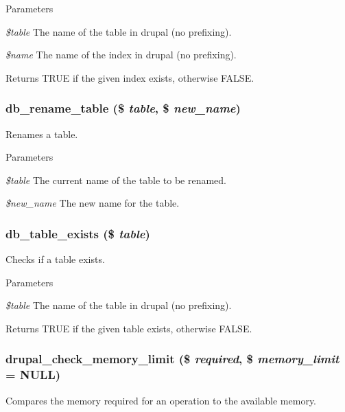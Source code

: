 \begin{DoxyParams}{Parameters}
\item[{\em \$table}]The name of the table in drupal (no prefixing). \item[{\em \$name}]The name of the index in drupal (no prefixing).\end{DoxyParams}
\begin{DoxyReturn}{Returns}
TRUE if the given index exists, otherwise FALSE. 
\end{DoxyReturn}
\hypertarget{group__schemaapi_ga629fe4d738f4caeb9d8c8acc2cc4d05b}{
\subsubsection[{db\_\-rename\_\-table}]{\setlength{\rightskip}{0pt plus 5cm}db\_\-rename\_\-table (\$ {\em table}, \/  \$ {\em new\_\-name})}}
\label{group__schemaapi_ga629fe4d738f4caeb9d8c8acc2cc4d05b}
Renames a table.


\begin{DoxyParams}{Parameters}
\item[{\em \$table}]The current name of the table to be renamed. \item[{\em \$new\_\-name}]The new name for the table. \end{DoxyParams}
\hypertarget{group__schemaapi_ga78809300cee80db034832825aed55b70}{
\subsubsection[{db\_\-table\_\-exists}]{\setlength{\rightskip}{0pt plus 5cm}db\_\-table\_\-exists (\$ {\em table})}}
\label{group__schemaapi_ga78809300cee80db034832825aed55b70}
Checks if a table exists.


\begin{DoxyParams}{Parameters}
\item[{\em \$table}]The name of the table in drupal (no prefixing).\end{DoxyParams}
\begin{DoxyReturn}{Returns}
TRUE if the given table exists, otherwise FALSE. 
\end{DoxyReturn}
\hypertarget{group__schemaapi_gad3a1c91d672f6e9cf9be66557db148fe}{
\subsubsection[{drupal\_\-check\_\-memory\_\-limit}]{\setlength{\rightskip}{0pt plus 5cm}drupal\_\-check\_\-memory\_\-limit (\$ {\em required}, \/  \$ {\em memory\_\-limit} = {\ttfamily NULL})}}
\label{group__schemaapi_gad3a1c91d672f6e9cf9be66557db148fe}
Compares the memory required for an operation to the available memory.



